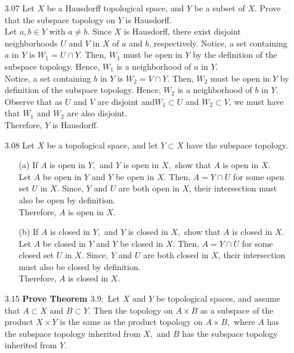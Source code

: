 \documentclass[12pt]{article}
\begin{document}
\begin{enumerate}
	\item[3.07] Let $X$ be a Hausdorff topological space, and $Y$ be a subset of $X .$ Prove that the subspace topology on $Y$ is Hausdorff.\\
	Let $ a,b\in Y $ with $ a \not= b $. Since $ X $ is Hausdorff, there exist disjoint neighborhoods $ U $ and $ V $ in $ X $ of $ a $ and $ b $, respectively. Notice, a set containing $ a $ in $ Y $ is $ W_1=U\cap Y $. Then, $ W_1 $ must be open in $ Y $ by the definition of the subspace topology. Hence, $ W_1 $ is a neighborhood of $ a $ in $ Y $. \\
	Notice, a set containing $ b $ in $ Y $ is $ W_2=V\cap Y $. Then, $ W_2 $ must be open in $ Y $ by definition of the subspace topology. Hence, $ W_2 $ is a neighborhood of $ b $ in $ Y $.\\
	Observe that as $ U $ and $V$ are disjoint and$ W_1 \subset U $ and $ W_2 \subset V $, we must have that $ W_1 $ and $ W_2 $ are also disjoint.\\
	Therefore, $ Y $ is Hausdorff.

	\item[3.08] Let $X$ be a topological space, and let $Y \subset X$ have the subspace topology.
		\begin{enumerate}
			\item[(a)] If $A$ is open in $Y ,$ and $Y$ is open in $X ,$ show that $A$ is open in $X .$\\
			Let $ A $ be open in $ Y $ and $ Y $ be open in $ X $. Then, $ A=Y\cap U $ for some open set $ U $ in $ X $. Since, $ Y $ and $ U $ are both open in $ X $, their intersection must also be open by definition.\\
			Therefore, $ A $ is open in $ X $.
			
			\item[(b)] If $A$ is closed in $Y ,$ and $Y$ is closed in $X ,$ show that $A$ is closed in $X .$\\
				Let $ A $ be closed in $ Y $ and $ Y $ be closed in $ X $. Then, $ A=Y\cap U $ for some closed set $ U $ in $ X $. Since, $ Y $ and $ U $ are both closed in $ X $, their intersection must also be closed by definition.\\
				Therefore, $ A $ is closed in $ X $.
		\end{enumerate}

	\item[3.15] \textbf{Prove Theorem $3.9 :$} Let $X$ and $Y$ be topological spaces, and assume that $A \subset X$ and $B \subset Y .$ Then the topology on $A \times B$ as a subspace of the product $X \times Y$ is the same as the product topology on $A \times B ,$ where $A$ has the subspace topology inherited from $X ,$ and $B$ has the subspace topology inherited from $Y .$


\end{enumerate}
\end{document}
